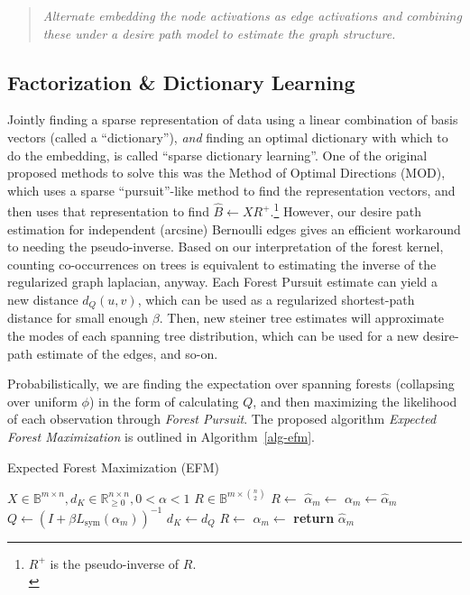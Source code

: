 \documentclass[%
	12pt,
		oneside,
		letterpaper
]{book}
\begin{document}
\begin{quote}
\emph{Alternate embedding the node activations as edge activations and
combining these under a desire path model to estimate the graph
structure.}
\end{quote}

\subsection{Factorization \& Dictionary
Learning}\label{factorization-dictionary-learning}

Jointly finding a sparse representation of data using a linear
combination of basis vectors (called a ``dictionary''), \emph{and}
finding an optimal dictionary with which to do the embedding, is called
``sparse dictionary learning''. One of the original proposed methods to
solve this was the Method of Optimal Directions
(MOD)\autocite{Methodoptimaldirections_Engan1999}, which uses a sparse
``pursuit''-like method to find the representation vectors, and then
uses that representation to find \(\hat{B}\gets XR^+\).\footnote{
  \(R^+\) is the pseudo-inverse of \(R\).\\
} However, our desire path estimation for independent (arcsine)
Bernoulli edges gives an efficient workaround to needing the
pseudo-inverse. Based on our interpretation of the forest kernel,
counting co-occurrences on trees is equivalent to estimating the inverse
of the regularized graph laplacian, anyway. Each Forest Pursuit estimate
can yield a new distance \(d_Q(u,v)\), which can be used as a
regularized shortest-path distance for small enough \(\beta\). Then, new
steiner tree estimates will approximate the modes of each spanning tree
distribution, which can be used for a new desire-path estimate of the
edges, and so-on.

Probabilistically, we are finding the expectation over spanning forests
(collapsing over uniform \(\phi\)) in the form of calculating \(Q\), and
then maximizing the likelihood of each observation through \emph{Forest
Pursuit}. The proposed algorithm \emph{Expected Forest Maximization} is
outlined in Algorithm~\ref{alg-efm}.

\begin{algorithm}[htb!]
\caption{Expected Forest Maximization (EFM)}
\label{alg-efm}
\begin{algorithmic}[1]
\Require $X\in \mathbb{B}^{m\times n}, d_K\in \mathbb{R}_{\geq 0}^{n\times n}, 0<\alpha<1$
\Ensure $R \in \mathbb{B}^{m \times {n\choose 2}}$
  \State $R \gets $
    \State $\hat{\alpha}_m\gets$
    \While {$\|\hat{\alpha}-\alpha\|_{\infty}>\epsilon$}
        \State $\alpha_m \gets \hat{\alpha}_m$
        \State $Q \gets (I+\beta L_{\text{sym}}(\alpha_m))^{-1}$
        \State $d_K \gets d_Q$
        \State $R \gets $
        \State $\hat{\alpha}_m\gets$
    \EndWhile
  \State \textbf{return} $\hat{\alpha}_m$
\EndProcedure
\end{algorithmic}
\end{algorithm}
\end{document}
